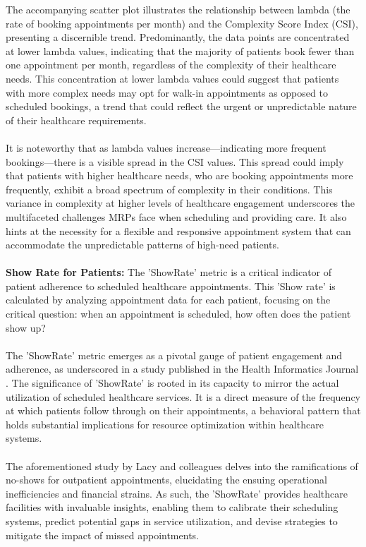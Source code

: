 \documentclass[11pt]{article}
\theoremstyle{definition}
\begin{document}
The accompanying scatter plot illustrates the relationship between lambda (the rate of booking appointments per month) and the Complexity Score Index (CSI), presenting a discernible trend. Predominantly, the data points are concentrated at lower lambda values, indicating that the majority of patients book fewer than one appointment per month, regardless of the complexity of their healthcare needs. This concentration at lower lambda values could suggest that patients with more complex needs may opt for walk-in appointments as opposed to scheduled bookings, a trend that could reflect the urgent or unpredictable nature of their healthcare requirements.\\\\
It is noteworthy that as lambda values increase—indicating more frequent bookings—there is a visible spread in the CSI values. This spread could imply that patients with higher healthcare needs, who are booking appointments more frequently, exhibit a broad spectrum of complexity in their conditions. This variance in complexity at higher levels of healthcare engagement underscores the multifaceted challenges MRPs face when scheduling and providing care. It also hints at the necessity for a flexible and responsive appointment system that can accommodate the unpredictable patterns of high-need patients.\\\\
\textbf{Show Rate for Patients: }
The 'ShowRate' metric is a critical indicator of patient adherence to scheduled healthcare appointments. This 'Show rate' is calculated by analyzing appointment data for each patient, focusing on the critical question: when an appointment is scheduled, how often does the patient show up?\\\\
The 'ShowRate' metric emerges as a pivotal gauge of patient engagement and adherence, as underscored in a study published in the Health Informatics Journal \citep{lacy2011appointment}. The significance of 'ShowRate' is rooted in its capacity to mirror the actual utilization of scheduled healthcare services. It is a direct measure of the frequency at which patients follow through on their appointments, a behavioral pattern that holds substantial implications for resource optimization within healthcare systems.\\\\
The aforementioned study by Lacy and colleagues delves into the ramifications of no-shows for outpatient appointments, elucidating the ensuing operational inefficiencies and financial strains. As such, the 'ShowRate' provides healthcare facilities with invaluable insights, enabling them to calibrate their scheduling systems, predict potential gaps in service utilization, and devise strategies to mitigate the impact of missed appointments.\\\\
\end{document}
